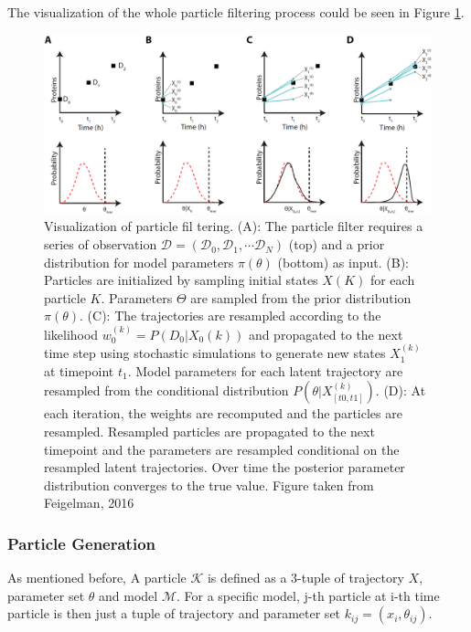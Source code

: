 \documentclass{bioinfo}
\begin{document}
The visualization of the whole particle filtering process could be seen in Figure \ref{fig:03}.

\begin{figure}[h]
\includegraphics[width=15cm]{figures/particle_filtering_2.png}
\caption{Visualization of particle fil	tering. (A): The particle filter requires a series of observation $\mathcal{D} = (\mathcal{D}_0, \mathcal{D}_1, \cdots \mathcal{D}_N)$ (top) and a prior distribution for model parameters $\pi(\theta)$ (bottom) as input. (B): Particles are initialized by sampling initial states $X(K)$ for each particle $K$. Parameters $\Theta$ are sampled from the prior distribution $\pi(\theta)$. (C): The trajectories are resampled according to the likelihood $w_0^{(k)} = P(D_0|X_0(k))$ and propagated to the next time step using stochastic simulations to generate new states $X_1^{(k)}$ at timepoint $t_1$. Model parameters for each latent trajectory are resampled from the conditional distribution $P(\theta|X^{(k)}_{[t0,t1]})$. (D): At each iteration, the weights are recomputed and the particles are resampled. Resampled particles are propagated to the next timepoint and the parameters are resampled conditional on the resampled latent trajectories. Over time the posterior parameter distribution converges to the true value. Figure taken from Feigelman, 2016 \citealp{Feigelman16}}  \label{fig:03}
\end{figure}

\vspace*{-6pt}

\subsubsection{Particle Generation}

As mentioned before, A particle $\mathcal{K}$ is defined as a 3-tuple of trajectory $X$, parameter set $\theta$ and model $\mathcal{M}$. For a specific model, j-th particle at i-th time particle is then just a tuple of trajectory and parameter set $k_{ij} = (x_i, \theta_{ij})$.
\end{document}
